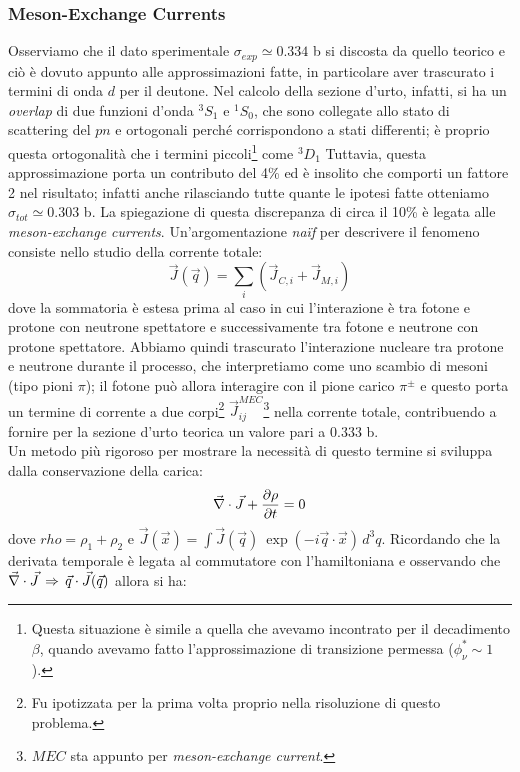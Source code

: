 \subsubsection{Meson-Exchange Currents}
Osserviamo che il dato sperimentale $\sigma_{exp} \simeq 0.334$ b si discosta da quello teorico e ciò è dovuto appunto alle approssimazioni fatte, in particolare aver trascurato i termini di onda $d$ per il deutone. Nel calcolo della sezione d'urto, infatti, si ha un \textit{overlap} di due funzioni d'onda ${^3S_1}$ e ${^1S_0}$, che sono collegate allo stato di scattering del $pn$ e ortogonali perché corrispondono a stati differenti; è proprio questa ortogonalità che  i termini piccoli\footnote{Questa situazione è simile a quella che avevamo incontrato per il decadimento $\beta$, quando avevamo fatto l'approssimazione di transizione permessa ($\phi_\nu^*\sim 1$).} come ${^3D_1}$
Tuttavia, questa approssimazione porta un contributo del 4\% ed è insolito che comporti un fattore 2 nel risultato; infatti anche rilasciando tutte quante le ipotesi fatte otteniamo $\sigma_{tot} \simeq 0.303$ b. La spiegazione di questa discrepanza di circa il 10\% è legata alle \textit{meson-exchange currents}. Un'argomentazione \textit{na\"if} per descrivere il fenomeno consiste nello studio della corrente totale:
$$\vec{J}(\vec{q}) = \sum_i (\vec{J}_{C,i} + \vec{J}_{M,i})$$
dove la sommatoria è estesa prima al caso in cui l'interazione è tra fotone e protone con neutrone spettatore e successivamente tra fotone e neutrone con protone spettatore. Abbiamo quindi trascurato l'interazione nucleare tra protone e neutrone durante il processo, che interpretiamo come uno scambio di mesoni (tipo pioni $\pi$); il fotone può allora interagire con il pione carico $\pi^\pm$ e questo porta un termine di corrente a due corpi\footnote{Fu ipotizzata per la prima volta proprio nella risoluzione di questo problema.} $\vec{J}_{ij}^{MEC}$\footnote{$MEC$ sta appunto per \textit{meson-exchange current}.} nella corrente totale, contribuendo a fornire per la sezione d'urto teorica un valore pari a $0.333$ b.\\
Un metodo più rigoroso per mostrare la necessità di questo termine si sviluppa dalla conservazione della carica:
$$\vec{\nabla}\cdot\vec{J}+\frac{\partial \rho}{\partial t} = 0$$
dove $rho = \rho_1 + \rho_2$ e $\vec{J}(\vec{x}) = \int \vec{J}(\vec{q})\:\exp{(-i\vec{q}\cdot\vec{x})}\,d^3q$. Ricordando che la derivata temporale è legata al commutatore con l'hamiltoniana e osservando che $\vec{\nabla}\cdot\vec{J}\,\Rightarrow\,\vec{q}\cdot\vec{J}(\vec{q})$ allora si ha:
